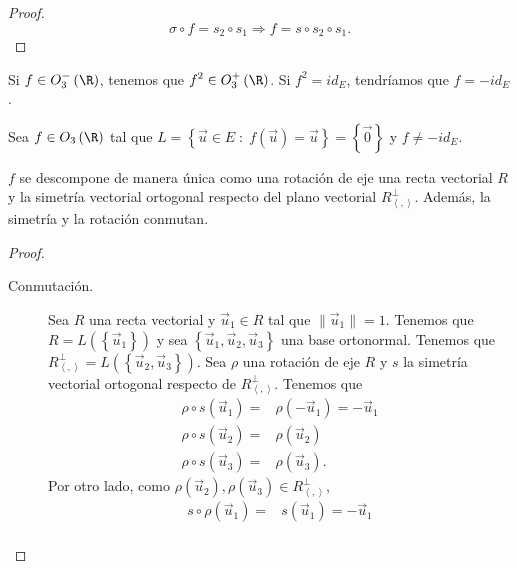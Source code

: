 \begin{description}
\begin{proof}
\[ \sigma \circ f = s_{2}\circ s_{1} \Rightarrow f = s \circ s_{2}\circ s_{1} .\]
\end{proof}
\begin{observation}
\normalfont Si $\displaystyle f \in O^{-}_{3}\left(\R\right) $, tenemos que $\displaystyle f^{2} \in O^{+}_{3}\left(\R\right) $. Si $\displaystyle f^{2} = id _{E} $, tendríamos que $\displaystyle f = - id _{E} $.
\end{observation}
Sea $\displaystyle f \in O_{3}\left(\R\right) $ tal que $\displaystyle L = \left\{ \vec{u} \in E \; : \; f\left(\vec{u}\right) = \vec{u}\right\}  = \left\{ \vec{0}\right\}  $ y $\displaystyle f \neq -id _{E} $.
\begin{ftheorem}[]
\normalfont $\displaystyle f $ se descompone de manera única como una rotación de eje una recta vectorial $\displaystyle R $ y la simetría vectorial ortogonal respecto del plano vectorial $\displaystyle R^{\perp }_{\left\langle ,  \right\rangle } $. Además, la simetría y la rotación conmutan.
\end{ftheorem}
\begin{proof}
	\begin{description}
	\item[Conmutación.] Sea $\displaystyle R $ una recta vectorial y $\displaystyle \vec{u}_{1} \in R $ tal que $\displaystyle \|\vec{u}_{1}\| = 1 $. Tenemos que $\displaystyle R = L\left( \left\{ \vec{u}_{1}\right\} \right) $ y sea $\displaystyle \left\{ \vec{u}_{1}, \vec{u}_{2}, \vec{u}_{3}\right\}  $ una base ortonormal. Tenemos que $\displaystyle R^{\perp }_{\left\langle ,  \right\rangle } = L\left( \left\{ \vec{u}_{2}, \vec{u}_{3}\right\} \right) $.
Sea $\displaystyle \rho $ una rotación de eje $\displaystyle R $ y $\displaystyle s $ la simetría vectorial ortogonal respecto de $\displaystyle R^{\perp }_{\left\langle ,  \right\rangle } $. Tenemos que 
\[
\begin{split}
	\rho\circ s\left(\vec{u}_{1}\right) = & \rho\left(-\vec{u}_{1}\right) = -\vec{u}_{1} \\
	\rho\circ s\left(\vec{u}_{2}\right)= & \rho\left(\vec{u}_{2}\right) \\
	\rho\circ s\left(\vec{u}_{3}\right) = & \rho\left(\vec{u}_{3}\right).
\end{split}
\]
Por otro lado, como $\displaystyle \rho\left(\vec{u}_{2}\right), \rho\left(\vec{u}_{3}\right)\in R^{\perp }_{\left\langle ,  \right\rangle } $,
\[
\begin{split}
	s \circ \rho\left(\vec{u}_{1}\right) = & s\left(\vec{u}_{1}\right) = -\vec{u}_{1} \\

\end{split}\]
\end{description}
\end{proof}
\end{description}
